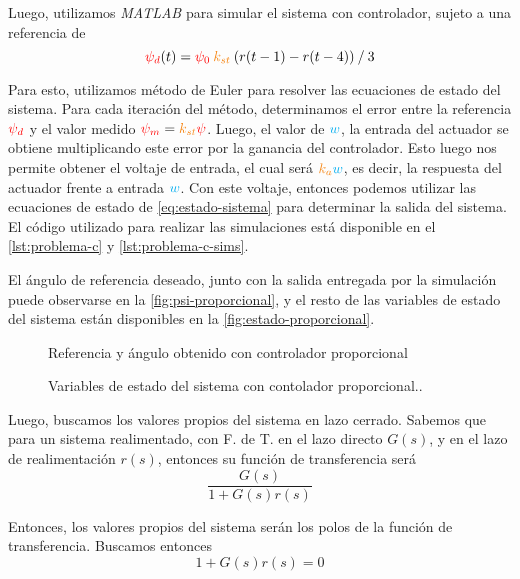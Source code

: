 Luego, utilizamos \textit{MATLAB} para simular el sistema con controlador, sujeto
a una referencia de
\begin{equation}
	\rojo{\psi_{d}}(t) = \rojo{\psi_{0}}\nara{k_{st}}\left(r(t-1) - r(t-4)\right) \mathbin{/} 3
\end{equation}

Para esto, utilizamos método de Euler para resolver las ecuaciones de estado
del sistema. Para cada iteración del método, determinamos el error entre la
referencia $\mathbin{\color{red}\psi_{d}}$ y el valor medido $\rojo{\psi_{m}} = \nara{k_{st}}\rojo{\psi}$.
Luego, el valor de $\mathbin{\color{cyan}w}$, la entrada del actuador se obtiene multiplicando
este error por la ganancia del controlador. Esto luego nos permite obtener el
voltaje de entrada, el cual será $\nara{k_{a}}\azul{w}$, es decir, la respuesta del
actuador frente a entrada $\mathbin{\color{cyan}w}$. Con este voltaje, entonces podemos utilizar
las ecuaciones de estado de \eqref{eq:estado-sistema} para determinar la salida del
sistema. El código utilizado para realizar las simulaciones está disponible en
el \autoref{lst:problema-c} y \autoref{lst:problema-c-sims}.

El ángulo de referencia deseado, junto con la salida entregada por la simulación
puede observarse en la \autoref{fig:psi-proporcional}, y el resto de las variables
de estado del sistema están disponibles en la \autoref{fig:estado-proporcional}.

\begin{figure}[h]
  \centering
  
  \caption{Referencia y ángulo obtenido con controlador proporcional}\label{fig:psi-proporcional}
\end{figure}

\begin{figure}[h]
  \centering
  
  \caption{Variables de estado del sistema con contolador proporcional..}\label{fig:estado-proporcional}
\end{figure}

Luego, buscamos los valores propios del sistema en lazo cerrado. Sabemos que
para un sistema realimentado, con F. de T. en el lazo directo $G(s)$, y en el
lazo de realimentación $r(s)$, entonces su función de transferencia será
\begin{equation}\label{eq:fdt-lc}
    \frac{G(s)}{1 + G(s)r(s)}
\end{equation}

Entonces, los valores propios del sistema serán los polos de la función de
transferencia. Buscamos entonces
\begin{equation}
  1 + G(s)r(s) = 0
\end{equation}

